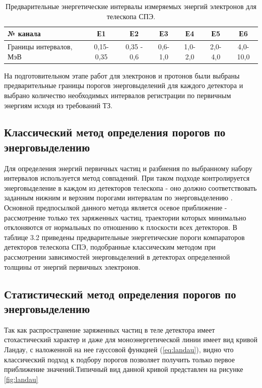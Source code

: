 \begin{table}
	\begin{tabular}{p{4.7cm}|cccccc}
№ канала&	Е1&	Е2&	Е3&	Е4&	Е5&	Е6\\ \hline
Границы интервалов, МэВ&	0,15-0,35&	0,35 - 0,6&	0,6-1,0&	1,0-2,0&	2,0-4,0&	4,0-10,0 
\end{tabular}
	\caption{Предварительные энергетические интервалы измеряемых энергий электронов для телескопа СПЭ.}
	\label{tab:elec_channel}
\end{table} 


На подготовительном этапе работ для электронов и протонов были выбраны предварительные границы порогов энерговыделений для каждого детектора и выбрано количество необходимых интервалов регистрации по первичным энергиям исходя из требований ТЗ. 
\subsection{Классический метод определения порогов по энерговыделению}
Для определения энергий первичных частиц и разбиения по выбранному набору интервалов используется метод совпадений. При таком подходе контролируется энерговыделение в каждом из детекторов телескопа - оно должно соответствовать заданным нижним и верхним порогами интервалам по энерговыделению . Основной предпосылкой данного метода является осевое приближение - рассмотрение только тех заряженных частиц, траектории которых минимально отклоняются от нормальных по отношению к плоскости всех детекторов. В таблице 3.2 приведены предварительные энергетические пороги компараторов детекторов телескопа СПЭ, подобранные классическим методом при рассмотрении зависимостей энерговыделений в детекторах определенной толщины от энергий первичных электронов.  



\subsection{Статистический метод определения порогов по энерговыделению}
Так как распространение заряженных частиц в теле детектора имеет стохастический характер и даже для моноэнергетической линии имеет вид кривой Ландау, с наложенной на нее гауссовой функцией (\ref{eq:landau}),  видно что классический подход к подбору порогов позволяет получить только первое приближение значений.Типичный вид данной кривой представлен на рисунке \ref{fig:landau}

